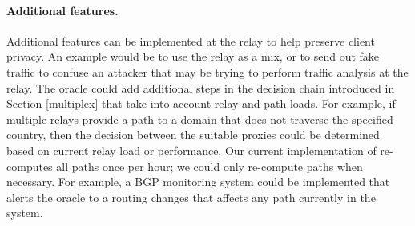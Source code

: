 \paragraph{Additional features.}  Additional features can be
implemented at the relay to help preserve client privacy.  An example
would be to use the relay as a mix, or to send out fake traffic to
confuse an attacker that may be trying to perform traffic analysis at
the relay.  The oracle could add additional steps in the decision
chain introduced in Section \ref{multiplex} that take into account
relay and path loads.  For example, if multiple relays provide a path
to a domain that does not traverse the specified country, then the
decision between the suitable proxies could be determined based on
current relay load or performance.  Our current implementation of
\system{} re-computes all paths once per hour; we could only
re-compute paths when necessary.  For example, a BGP monitoring system
could be implemented that alerts the oracle to a routing changes that
affects any path currently in the system.
